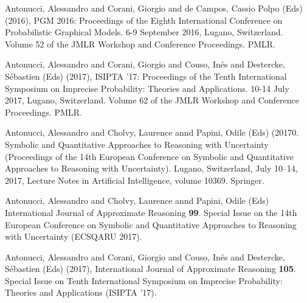 





\begin{cventries}
\begin{cvitems}
\item Antonucci, Alessandro and Corani, Giorgio and de Campos, Cassio Polpo (Eds) (2016), PGM 2016: Proceedings of the Eighth International Conference on Probabilistic Graphical Models. 6-9 September 2016, Lugano, Switzerland. Volume 52 of the JMLR Workshop and Conference Proceedings. PMLR.
\item Antonucci, Alessandro and Corani, Giorgio and Couso, Inés and Destercke, Sébastien (Eds) (2017), ISIPTA '17: Proceedings of the Tenth International Symposium on Imprecise Probability: Theories and Applications. 10-14 July 2017, Lugano, Switzerland. Volume 62 of the JMLR Workshop and Conference Proceedings. PMLR.
\item Antonucci, Alessandro and Cholvy, Laurence annd Papini, Odile (Eds) (20170. Symbolic and Quantitative Approaches to Reasoning with Uncertainty (Proceedings of the 14th European Conference on Symbolic and Quantitative Approaches to Reasoning with Uncertainty). Lugano, Switzerland, July 10–14, 2017, Lecture Notes in Artificial Intelligence, volume 10369. Springer.
\item Antonucci, Alessandro and Cholvy, Laurence annd Papini, Odile (Eds) International Journal of Approximate Reasoning {\bf{99}}. Special Issue on the 14th European Conference on Symbolic and Quantitative Approaches to Reasoning with Uncertainty (ECSQARU 2017).
\item Antonucci, Alessandro and Corani, Giorgio and Couso, Inés and Destercke, Sébastien (Eds) (2017), International Journal of Approximate Reasoning {\bf{105}}. Special Issue on Tenth International Symposium on Imprecise Probability: Theories and Applications (ISIPTA ’17).
\end{cvitems}
\end{cventries}
